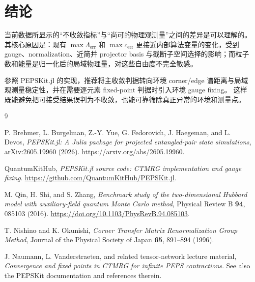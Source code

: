 \documentclass[11pt,a4paper]{ctexart}
\newcommand{\pepskit}{PEPSKit.jl}
\begin{document}
\section{结论}

当前数据所显示的“不收敛指标”与“尚可的物理观测量”之间的差异是可以理解的。
其核心原因是：现有 $\max\Lambda_{\mathrm{err}}$ 和 $\max c_{\mathrm{err}}$ 更接近内部算法变量的变化，受到 gauge、normalization、近简并 projector basis 与截断子空间选择的影响；而粒子数和能量是归一化后的局域物理量，对这些自由度不完全敏感。

参照 \pepskit{} 的实现，推荐将主收敛判据转向环境 corner/edge 谱距离与局域观测量稳定性，并在需要逐元素 fixed-point 判据时引入环境 gauge fixing。
这样既能避免把可接受结果误判为不收敛，也能可靠筛除真正异常的环境和测量点。

\begin{thebibliography}{9}

P. Brehmer, L. Burgelman, Z.-Y. Yue, G. Fedorovich, J. Haegeman, and L. Devos,
\textit{PEPSKit.jl: A Julia package for projected entangled-pair state simulations},
arXiv:2605.19960 (2026).
\url{https://arxiv.org/abs/2605.19960}.

QuantumKitHub,
\textit{PEPSKit.jl source code: CTMRG implementation and gauge fixing}.
\url{https://github.com/QuantumKitHub/PEPSKit.jl}.

M. Qin, H. Shi, and S. Zhang,
\textit{Benchmark study of the two-dimensional Hubbard model with auxiliary-field quantum Monte Carlo method},
Physical Review B \textbf{94}, 085103 (2016).
\url{https://doi.org/10.1103/PhysRevB.94.085103}.

T. Nishino and K. Okunishi,
\textit{Corner Transfer Matrix Renormalization Group Method},
Journal of the Physical Society of Japan \textbf{65}, 891--894 (1996).

J. Naumann, L. Vanderstraeten, and related tensor-network lecture material,
\textit{Convergence and fixed points in CTMRG for infinite PEPS contractions}.
See also the PEPSKit documentation and references therein.

\end{thebibliography}
\end{document}
